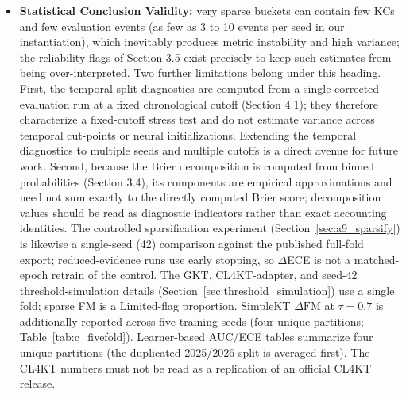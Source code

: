 \begin{itemize}
    \item \textbf{Statistical Conclusion Validity:} very sparse buckets can contain few KCs and few evaluation events (as few as 3 to 10 events per seed in our instantiation), which inevitably produces metric instability and high variance; the reliability flags of Section 3.5 exist precisely to keep such estimates from being over-interpreted. Two further limitations belong under this heading. First, the temporal-split diagnostics are computed from a single corrected evaluation run at a fixed chronological cutoff (Section 4.1); they therefore characterize a fixed-cutoff stress test and do not estimate variance across temporal cut-points or neural initializations. Extending the temporal diagnostics to multiple seeds and multiple cutoffs is a direct avenue for future work. Second, because the Brier decomposition is computed from binned probabilities (Section 3.4), its components are empirical approximations and need not sum exactly to the directly computed Brier score; decomposition values should be read as diagnostic indicators rather than exact accounting identities. The controlled sparsification experiment (Section~\ref{sec:a9_sparsify}) is likewise a single-seed (42) comparison against the published full-fold export; reduced-evidence runs use early stopping, so $\Delta$ECE is not a matched-epoch retrain of the control. The GKT, CL4KT-adapter, and seed-42 threshold-simulation details (Section~\ref{sec:threshold_simulation}) use a single fold; sparse FM is a Limited-flag proportion. SimpleKT $\Delta\mathrm{FM}$ at $\tau=0.7$ is additionally reported across five training seeds (four unique partitions; Table~\ref{tab:c_fivefold}). Learner-based AUC/ECE tables summarize four unique partitions (the duplicated 2025/2026 split is averaged first). The CL4KT numbers must not be read as a replication of an official CL4KT release.
\end{itemize}
